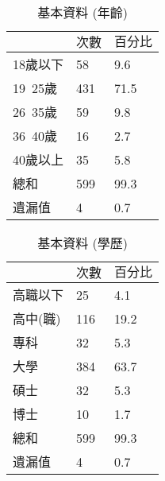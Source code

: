 \begin{table}[htb]
\caption{基本資料 (年齡)}
\label{tab:PL2}
\renewcommand{\arraystretch}{1.2} %
\arrayrulewidth=1pt               %
\tabcolsep=60pt                   %
%
\begin{tabular}[t]{lll}  %
\hline
 & $次數$ & $百分比$ \\
\hline
18歲以下        & 58  & 9.6 \\
19~25歲        & 431  & 71.5 \\
26~35歲        & 59  & 9.8 \\
36~40歲        & 16  &2.7\\
40歲以上        & 35  & 5.8 \\
總和               & 599  & 99.3 \\
遺漏值            & 4 & 0.7 \\
\hline
\end{tabular}
\end{table}

\begin{table}[htb]
\caption{基本資料 (學歷)}
\label{tab:PL3}
\renewcommand{\arraystretch}{1.2} %
\arrayrulewidth=1pt               %
\tabcolsep=60pt                   %
%
\begin{tabular}[t]{lll}  %
\hline
 & $次數$ & $百分比$ \\
\hline
高職以下       & 25  & 4.1 \\
高中(職)        & 116  & 19.2 \\
專科        & 32  & 5.3 \\
大學        & 384 &63.7\\
碩士        & 32  & 5.3 \\
博士           & 10  & 1.7 \\
總和           & 599  & 99.3 \\
遺漏值            & 4 & 0.7 \\
\hline
\end{tabular}
\end{table}

